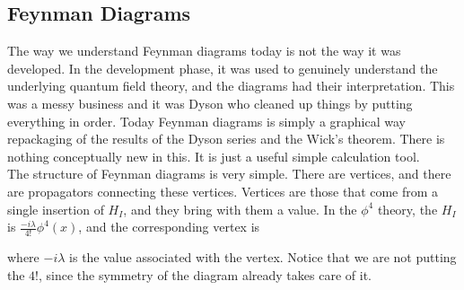 \documentclass[11pt, notitlepage]{report}
\numberwithin{equation}{section}
\begin{document}
    \subsection{Feynman Diagrams}
    The way we understand Feynman diagrams today is not the way it was developed. In the development phase, it was used to genuinely understand the underlying quantum field theory, and the diagrams had their interpretation. This was a messy business and it was Dyson who cleaned up things by putting everything in order. Today Feynman diagrams is simply a graphical way repackaging of the results of the Dyson series and the Wick's theorem. There is nothing conceptually new in this. It is just a useful simple calculation tool. \\

    The structure of Feynman diagrams is very simple. There are vertices, and there are propagators connecting these vertices. Vertices are those that come from a single insertion of \(H_I\), and they bring with them a value. In the \(\phi^4\) theory, the \(H_I\) is \(\displaystyle\frac{-i\lambda}{4!}\phi^4(x)\), and the corresponding vertex is 

    \begin{figure}[h]
        \centering
    \end{figure}
    where \(-i\lambda\) is the value associated with the vertex. Notice that we are not putting the \(4!\), since the symmetry of the diagram already takes care of it.\\
\end{document}
